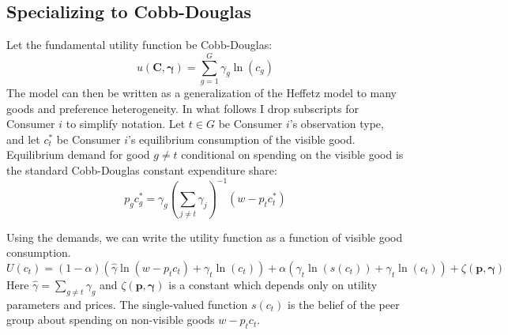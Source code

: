 \documentclass[11pt]{article}
\begin{document}
\begin{CJK}{UTF8}{gbsn}
\subsection{Specializing to Cobb-Douglas}

Let the fundamental utility function be Cobb-Douglas:
\[u(\mathbf{C}, \boldsymbol{\gamma}) = \sum_{g=1}^{G} \gamma_g \ln(c_g)\]
The model can then be written as a generalization of the Heffetz model to many goods and preference heterogeneity.\footnotemark{}
In what follows I drop subscripts for Consumer $i$ to simplify notation. Let $t \in G$ be Consumer $i$'s observation type, and let $c_{t}^*$ be Consumer $i$'s equilibrium consumption of the visible good.  Equilibrium demand for good $g\neq t$ conditional on spending on the visible good is the standard Cobb-Douglas constant expenditure share:
\begin{equation}
    \label{eq:opt_cobb}
    p_g c_g^* = \gamma_g\left(\sum_{j\neq t} \gamma_j\right)^{-1}\left(w-p_t c_t^* \right)
\end{equation}

Using the demands, we can write the utility function as a function of visible good consumption.
\begin{equation}
    \label{eq:ufun}
    U(c_t) = (1-\alpha) \left(\hat{\gamma} \ln \left(w-p_t c_t\right) + \gamma_t \ln \left(c_t \right)\right) + \alpha \left(\gamma_t \ln \left(s(c_t)\right) + \gamma_t \ln \left(c_t\right) \right) + \zeta(\mathbf{p},\boldsymbol{\gamma})
\end{equation}
Here $\hat{\gamma} = \sum_{g\neq t} \gamma_g$ and $\zeta(\mathbf{p},\boldsymbol{\gamma})$ is a constant which depends only on utility parameters and prices.  The single-valued function $s(c_t)$ is the belief of the peer group about spending on non-visible goods $w-p_t c_t$. 


\end{CJK}
\end{document}

